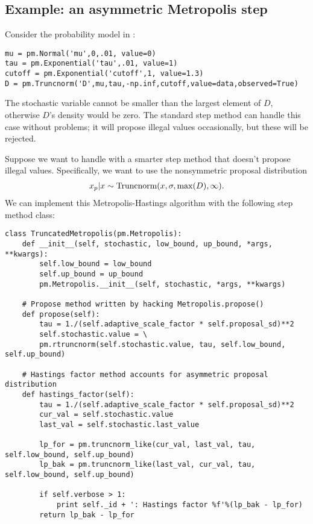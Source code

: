 \hypertarget{custom_stepper_example}{}
\subsection{Example: an asymmetric Metropolis step} \label{user-gen}
Consider the probability model in : 
\begin{verbatim}
mu = pm.Normal('mu',0,.01, value=0)
tau = pm.Exponential('tau',.01, value=1)
cutoff = pm.Exponential('cutoff',1, value=1.3)
D = pm.Truncnorm('D',mu,tau,-np.inf,cutoff,value=data,observed=True)
\end{verbatim}
The stochastic variable  cannot be smaller than the largest element of $D$, otherwise $D$'s density would be zero. The standard  step method can handle this case without problems; it will propose illegal values occasionally, but these will be rejected. 

\medskip
Suppose we want to handle  with a smarter step method that doesn't propose illegal values. Specifically, we want to use the nonsymmetric proposal distribution
\begin{eqnarray*}
	x_p | x \sim \textup{Truncnorm}(x, \sigma, \max(D), \infty).
\end{eqnarray*}
We can implement this Metropolis-Hastings algorithm with the following step method class:
\begin{verbatim}
class TruncatedMetropolis(pm.Metropolis):
    def __init__(self, stochastic, low_bound, up_bound, *args, **kwargs):
        self.low_bound = low_bound
        self.up_bound = up_bound
        pm.Metropolis.__init__(self, stochastic, *args, **kwargs)

    # Propose method written by hacking Metropolis.propose()
    def propose(self):
        tau = 1./(self.adaptive_scale_factor * self.proposal_sd)**2
        self.stochastic.value = \
        pm.rtruncnorm(self.stochastic.value, tau, self.low_bound, self.up_bound)

    # Hastings factor method accounts for asymmetric proposal distribution    
    def hastings_factor(self):
        tau = 1./(self.adaptive_scale_factor * self.proposal_sd)**2
        cur_val = self.stochastic.value
        last_val = self.stochastic.last_value

        lp_for = pm.truncnorm_like(cur_val, last_val, tau, self.low_bound, self.up_bound)
        lp_bak = pm.truncnorm_like(last_val, cur_val, tau, self.low_bound, self.up_bound)   

        if self.verbose > 1:
            print self._id + ': Hastings factor %f'%(lp_bak - lp_for)     
        return lp_bak - lp_for
\end{verbatim}

